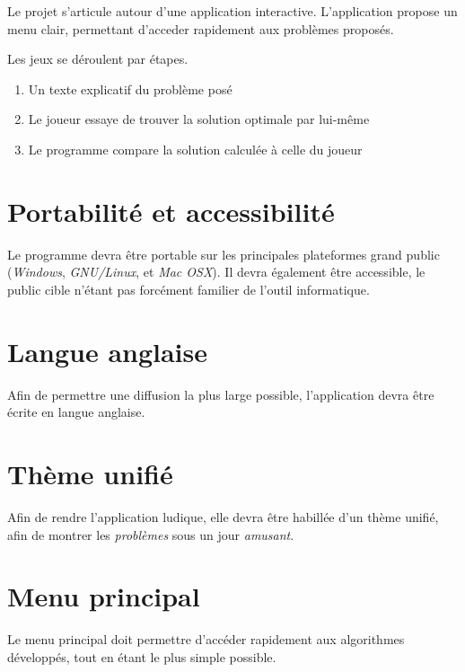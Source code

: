 Le projet s'articule autour d'une application interactive.
L'application propose un menu clair, permettant
d'acceder rapidement aux problèmes proposés.

Les jeux se déroulent par étapes.
\begin{enumerate}
    \item Un texte explicatif du problème posé
    \item Le joueur essaye de trouver la solution optimale par lui-même
    \item Le programme compare la solution calculée à celle du joueur
\end{enumerate}

\section{Portabilité et accessibilité}
    Le programme devra être portable sur les principales plateformes
    grand public (\emph{Windows}, \emph{GNU/Linux}, et \emph{Mac OSX}).
    Il devra également être accessible, le public cible n'étant
    pas forcément familier de l'outil informatique.

\section{Langue anglaise}
    Afin de permettre une diffusion la plus large possible,
    l'application devra être écrite en langue anglaise.

\section{Thème unifié}
    Afin de rendre l'application ludique, elle devra
    être habillée d'un thème unifié,
    afin de montrer les \emph{problèmes} sous un
    jour \emph{amusant}.

\section{Menu principal}
    Le menu principal doit permettre d'accéder rapidement
    aux algorithmes développés, tout en étant le plus simple possible.

